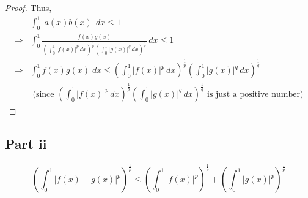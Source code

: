 \begin{answer}
\begin{proof}
        Thus,
        \begin{equation}
            \begin{aligned}
                &\int_0^1 \lvert a(x)b(x) \rvert \,dx \leq 1\\
                \Rightarrow & \int_0^1\tfrac{f(x)g(x)}{(\int_0^1\lvert f(x) \rvert^p \, dx)^{\frac{1}{p}}(\int_0^1\lvert g(x) \rvert^q \, dx)^{\frac{1}{q}}} \,dx\leq 1\\
                \Rightarrow & \int_0^1 f(x)g(x) \;dx \leq \left(\int_0^1\lvert f(x) \rvert^p \, dx\right)^{\frac{1}{p}}\left(\int_0^1\lvert g(x) \rvert^q \, dx\right)^{\frac{1}{q}}\\
                &\text{ (since $\left(\int_0^1\lvert f(x) \rvert^p \, dx\right)^{\frac{1}{p}}\left(\int_0^1\lvert g(x) \rvert^q \, dx\right)^{\frac{1}{q}}$ is just a positive number)}
            \end{aligned}
        \end{equation}
    \end{proof}
\end{answer}

\subsection{Part ii}

\begin{question}
    \begin{equation}
        \left(\int_0^1|f(x)+g(x)|^p\right)^{\frac{1}{p}} \leq\left(\int_0^1|f(x)|^p\right)^{\frac{1}{p}}+\left(\int_0^1|g(x)|^p\right)^{\frac{1}{p}}
    \end{equation}
\end{question}


